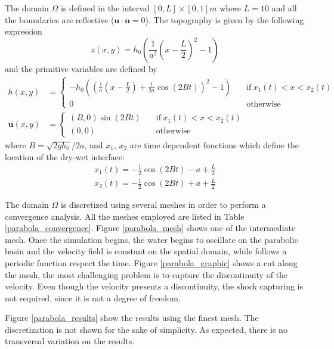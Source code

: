 \documentclass[a4paper,12pt]{article}
\begin{document}
The domain $\Omega$ is defined in the interval $[0,L]\times[0,1]m$ where $L=10$ and all the boundaries are reflective ($\mathbf{u}\cdot\mathbf{n} = 0$). The topography is given by the following expression
\begin{equation}
z(x,y) = h_0 \left(\frac{1}{a^2}\left(x - \frac{L}{2}\right)^2 - 1\right)
\end{equation}
and the primitive variables are defined by
\begin{subequations}
\begin{align}
h(x,y) &=
\begin{cases}
-h_0\left(\left(\frac{1}{a}\left(x - \frac{L}{2}\right) + \frac{1}{2a}\cos(2Bt)\right)^2 - 1\right)
\quad &\text{if} \ x_1(t) < x < x_2(t) \\
0 \quad &\text{otherwise}
\end{cases} \\
\mathbf{u}(x,y) &=
\begin{cases}
(B,0)\sin(2Bt) \quad &\text{if} \ x_1(t) < x < x_2(t) \\
(0,0) \quad &\text{otherwise}
\end{cases}
\end{align}
\end{subequations}
where $B=\sqrt{2gh_0}/2a$, and $x_1$, $x_2$ are time dependent functions which define the location of the dry-wet interface:
\begin{equation}
\begin{split}
x_1(t) = -\frac{1}{2}\cos(2Bt) - a + \frac{L}{2} \\
x_2(t) = -\frac{1}{2}\cos(2Bt) + a + \frac{L}{2}
\end{split}
\end{equation}

The domain $\Omega$ is discretized using several meshes in order to perform a convergence analysis. All the meshes employed are listed in Table \ref{parabola_convergence}. Figure \ref{parabola_mesh} shows one of the intermediate mesh. Once the simulation begins, the water begins to oscillate on the parabolic basin and the velocity field is constant on the spatial domain, while follows a periodic function respect the time. Figure \ref{parabola_graphic} shows a cut along the mesh, the most challenging problem is to capture the discontinuity of the velocity. Even though the velocity presents a discontinuity, the shock capturing is not required, since it is not a degree of freedom.

Figure \ref{parabola_results} show the results using the finest mesh. The discretization is not shown for the sake of simplicity. As expected, there is no transversal variation on the results.
\end{document}
